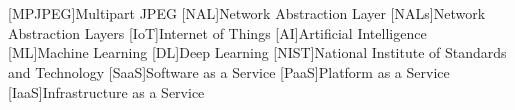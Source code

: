 {}
\chapter*{\acronymLabel}

\begin{acronym}[MPJPEG]
    [MPJPEG]{Multipart JPEG}
    [NAL]{Network Abstraction Layer}
    [NALs]{Network Abstraction Layers}
    [IoT]{Internet of Things}
    [AI]{Artificial Intelligence}
    [ML]{Machine Learning}
    [DL]{Deep Learning}
    [NIST]{National Institute of Standards and Technology}
    [SaaS]{Software as a Service}
    [PaaS]{Platform as a Service}
    [IaaS]{Infrastructure as a Service}
\end{acronym}

